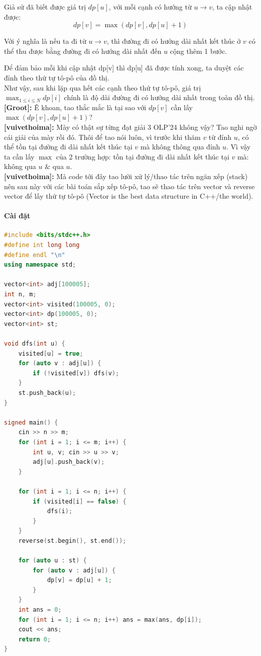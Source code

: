 Giả sử đã biết được giá trị $dp[u]$, với mỗi cạnh có hướng từ $u \rightarrow v$, ta cập nhật được:
\[
    dp[v] = \max(dp[v], dp[u] + 1)
\]

Với ý nghĩa là nếu ta đi từ $u \rightarrow v$, thì đường đi có hướng dài nhất kết thúc ở $v$ có thể thu được bằng đường đi có hướng dài nhất đến $u$ cộng thêm 1 bước.

Để đảm bảo mỗi khi cập nhật dp[v] thì dp[u] đã được tính xong, ta duyệt các đỉnh theo thứ tự tô-pô của đồ thị.\\

Như vậy, sau khi lặp qua hết các cạnh theo thứ tự tô-pô, giá trị $\max_{1 \leq i \leq N} dp[i]$ chính là độ dài đường đi có hướng dài nhất trong toàn đồ thị.\\

\textbf{[Groot]:} Ê khoan, tao thắc mắc là tại sao với $dp[v]$ cần lấy $\max(dp[v], dp[u] + 1)$?\\

\textbf{[vuivethoima]:} Mày có thật sự từng đạt giải 3 OLP'24 không vậy? Tao nghi ngờ cái giải của mày rồi đó. Thôi để tao nói luôn, vì trước khi thăm $v$ từ đỉnh $u$, có thể tồn tại đường đi dài nhất kết thúc tại $v$ mà không thông qua đỉnh $u$. Vì vậy ta cần lấy $\max$ của 2 trường hợp: tồn tại đường đi dài nhất kết thúc tại $v$ mà: không qua $u$ $\&$ qua $u$.\\

\textbf{[vuivethoima]:} Mà code tới đây tao lười xử lý/thao tác trên ngăn xếp (stack) nên sau này với các bài toán sắp xếp tô-pô, tao sẽ thao tác trên vector và reverse vector để lấy thứ tự tô-pô (Vector is the best data structure in C++/the world).

\paragraph{Cài đặt}
\begin{lstlisting}[language=C++]
#include <bits/stdc++.h>
#define int long long
#define endl "\n"
using namespace std;

vector<int> adj[100005];
int n, m; 
vector<int> visited(100005, 0);
vector<int> dp(100005, 0);
vector<int> st;

void dfs(int u) {
    visited[u] = true;
    for (auto v : adj[u]) {
        if (!visited[v]) dfs(v);
    }
    st.push_back(u);
}

signed main() {
    cin >> n >> m;
    for (int i = 1; i <= m; i++) {
        int u, v; cin >> u >> v;
        adj[u].push_back(v);
    }    

    for (int i = 1; i <= n; i++) {
        if (visited[i] == false) {
            dfs(i);
        }
    }
    reverse(st.begin(), st.end());

    for (auto u : st) {
        for (auto v : adj[u]) {
            dp[v] = dp[u] + 1;
        }
    }
    int ans = 0;
    for (int i = 1; i <= n; i++) ans = max(ans, dp[i]);
    cout << ans;
    return 0;
}
\end{lstlisting}